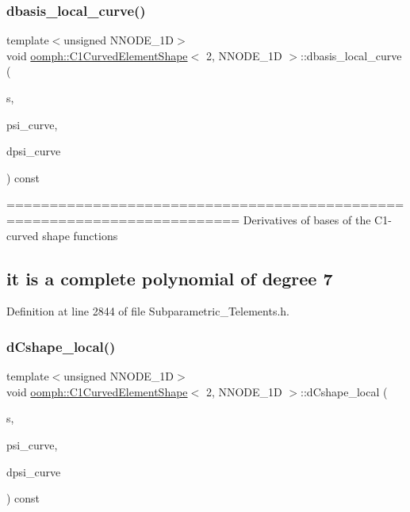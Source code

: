 \subsubsection{\texorpdfstring{dbasis\+\_\+local\+\_\+curve()}{dbasis\_local\_curve()}}
{\footnotesize\ttfamily template$<$unsigned N\+N\+O\+D\+E\+\_\+1D$>$ \\
void \hyperlink{classoomph_1_1C1CurvedElementShape}{oomph\+::\+C1\+Curved\+Element\+Shape}$<$ 2, N\+N\+O\+D\+E\+\_\+1D $>$\+::dbasis\+\_\+local\+\_\+curve (\begin{DoxyParamCaption}\item[{const \hyperlink{classoomph_1_1Vector}{Vector}$<$ double $>$ \&}]{s,  }\item[{\hyperlink{classoomph_1_1Shape}{Shape} \&}]{psi\+\_\+curve,  }\item[{\hyperlink{classoomph_1_1DShape}{D\+Shape} \&}]{dpsi\+\_\+curve }\end{DoxyParamCaption}) const\hspace{0.3cm}{\ttfamily [inline]}}

========================================================================= Derivatives of bases of the C1-\/curved shape functions \subsection*{it is a complete polynomial of degree 7 }

Definition at line 2844 of file Subparametric\+\_\+\+Telements.\+h.

\mbox{\label{classoomph_1_1C1CurvedElementShape_3_012_00_01NNODE__1D_01_4_aa2eae369074920a107f6117b3b152520}} 
\subsubsection{\texorpdfstring{d\+Cshape\+\_\+local()}{dCshape\_local()}}
{\footnotesize\ttfamily template$<$unsigned N\+N\+O\+D\+E\+\_\+1D$>$ \\
void \hyperlink{classoomph_1_1C1CurvedElementShape}{oomph\+::\+C1\+Curved\+Element\+Shape}$<$ 2, N\+N\+O\+D\+E\+\_\+1D $>$\+::d\+Cshape\+\_\+local (\begin{DoxyParamCaption}\item[{const \hyperlink{classoomph_1_1Vector}{Vector}$<$ double $>$ \&}]{s,  }\item[{\hyperlink{classoomph_1_1Shape}{Shape} \&}]{psi\+\_\+curve,  }\item[{\hyperlink{classoomph_1_1DShape}{D\+Shape} \&}]{dpsi\+\_\+curve }\end{DoxyParamCaption}) const\hspace{0.3cm}{\ttfamily [inline]}}

